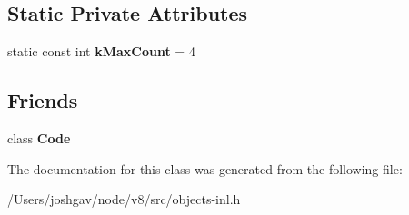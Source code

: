 \subsection*{Static Private Attributes}
\begin{DoxyCompactItemize}
\item 
static const int {\bfseries k\+Max\+Count} = 4\hypertarget{classv8_1_1internal_1_1_code_1_1_find_and_replace_pattern_a388d0d7ac8053f8fc8b010c6510f1ae9}{}\label{classv8_1_1internal_1_1_code_1_1_find_and_replace_pattern_a388d0d7ac8053f8fc8b010c6510f1ae9}

\end{DoxyCompactItemize}
\subsection*{Friends}
\begin{DoxyCompactItemize}
\item 
class {\bfseries Code}\hypertarget{classv8_1_1internal_1_1_code_1_1_find_and_replace_pattern_aedc338bfccace8e957c4170e741fd43a}{}\label{classv8_1_1internal_1_1_code_1_1_find_and_replace_pattern_aedc338bfccace8e957c4170e741fd43a}

\end{DoxyCompactItemize}


The documentation for this class was generated from the following file\+:\begin{DoxyCompactItemize}
\item 
/\+Users/joshgav/node/v8/src/objects-\/inl.\+h\end{DoxyCompactItemize}
